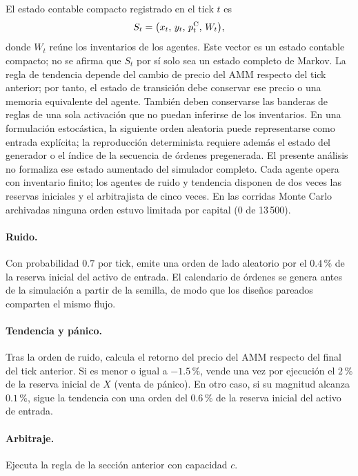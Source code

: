 El estado contable compacto registrado en el tick $t$ es
\begin{equation}
  S_t = \bigl(x_t,\,y_t,\,p^{\mathrm{C}}_t,\,W_t\bigr),
  \label{eq:estado}
\end{equation}
donde $W_t$ reúne los inventarios de los agentes. Este vector es un estado contable compacto; no se afirma que $S_t$ por sí solo sea un estado completo de Markov. La regla de tendencia depende del cambio de precio del AMM respecto del tick anterior; por tanto, el estado de transición debe conservar ese precio o una memoria equivalente del agente. También deben conservarse las banderas de reglas de una sola activación que no puedan inferirse de los inventarios. En una formulación estocástica, la siguiente orden aleatoria puede representarse como entrada explícita; la reproducción determinista requiere además el estado del generador o el índice de la secuencia de órdenes pregenerada. El presente análisis no formaliza ese estado aumentado del simulador completo. Cada agente opera con inventario finito; los agentes de ruido y tendencia disponen de dos veces las reservas iniciales y el arbitrajista de cinco veces. En las corridas Monte Carlo archivadas ninguna orden estuvo limitada por capital (0 de 13\,500).

\paragraph{Ruido.} Con probabilidad $0.7$ por tick, emite una orden de lado aleatorio por el $0.4\,\%$ de la reserva inicial del activo de entrada. El calendario de órdenes se genera antes de la simulación a partir de la semilla, de modo que los diseños pareados comparten el mismo flujo.

\paragraph{Tendencia y pánico.} Tras la orden de ruido, calcula el retorno del precio del AMM respecto del final del tick anterior. Si es menor o igual a $-1.5\,\%$, vende una vez por ejecución el $2\,\%$ de la reserva inicial de $X$ (venta de pánico). En otro caso, si su magnitud alcanza $0.1\,\%$, sigue la tendencia con una orden del $0.6\,\%$ de la reserva inicial del activo de entrada.

\paragraph{Arbitraje.} Ejecuta la regla de la sección anterior con capacidad $c$.

